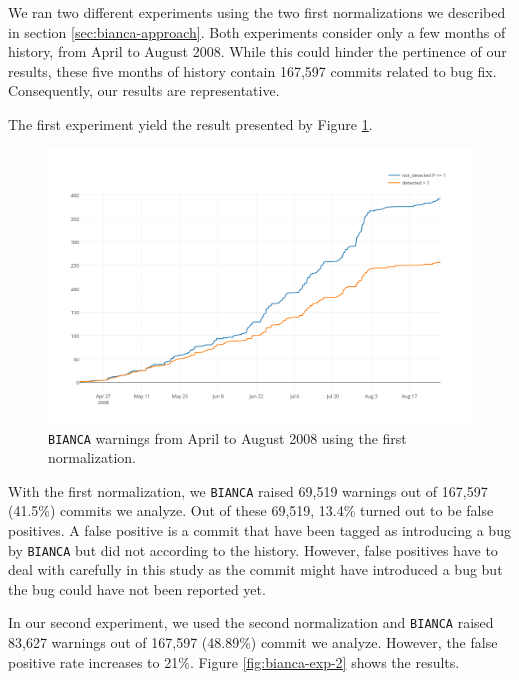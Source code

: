 We ran two different experiments using the two first normalizations we described in section \ref{sec:bianca-approach}. Both experiments consider only a few months of history, from April to August 2008. While this could hinder the pertinence of our results, these five months of history contain 167,597 commits related to bug fix. Consequently, our results are representative.

The first experiment yield the result presented by Figure \ref{fig:bianca-exp-1}.

\begin{figure}[h!]
  \centering
    \includegraphics[scale=0.55]{media/bianca-13.png}
    \caption{{\tt BIANCA} warnings from April to August 2008 using the first normalization.
    \label{fig:bianca-exp-1}}
\end{figure}

With the first normalization, we {\tt BIANCA} raised 69,519 warnings out of 167,597 (41.5\%) commits we analyze. Out of these 69,519, 13.4\% turned out to be false positives. A false positive is a commit that have been tagged as introducing a bug by {\tt BIANCA} but did not according to the history. However, false positives have to deal with carefully in this study as the commit might have introduced a bug but the bug could have not been reported yet.

In our second experiment, we used the second normalization and {\tt BIANCA} raised 83,627 warnings out of 167,597 (48.89\%) commit we analyze. However, the false positive rate increases to 21\%. Figure \ref{fig:bianca-exp-2} shows the results.

